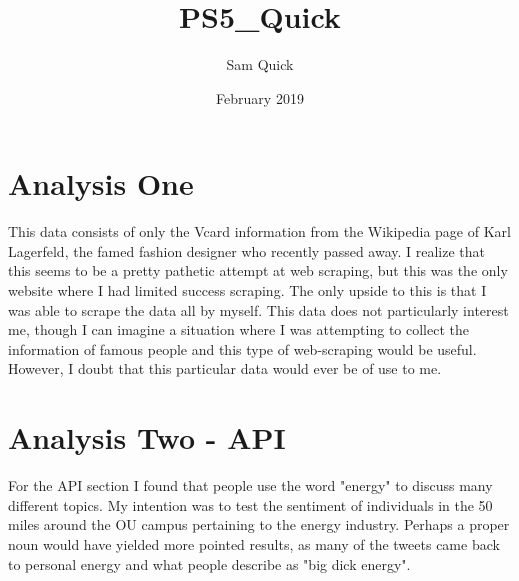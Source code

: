 \documentclass{article}
\title{PS5_Quick}
\author{Sam Quick}
\date{February 2019}
\begin{document}
\maketitle

\section{Analysis One}
This data consists of only the Vcard information from the Wikipedia page of Karl Lagerfeld, the famed fashion designer who recently passed away. I realize that this seems to be a pretty pathetic attempt at web scraping, but this was the only website where I had limited success scraping. The only upside to this is that I was able to scrape the data all by myself.
This data does not particularly interest me, though I can imagine a situation where I was attempting to collect the information of famous people and this type of web-scraping would be useful. However, I doubt that this particular data would ever be of use to me.

\section{Analysis Two - API}
For the API section I found that people use the word "energy" to discuss many different topics. My intention was to test the sentiment of individuals in the 50 miles around the OU campus pertaining to the energy industry. Perhaps a proper noun would have yielded more pointed results, as many of the tweets came back to personal energy and what people describe as "big dick energy".
\end{document}
